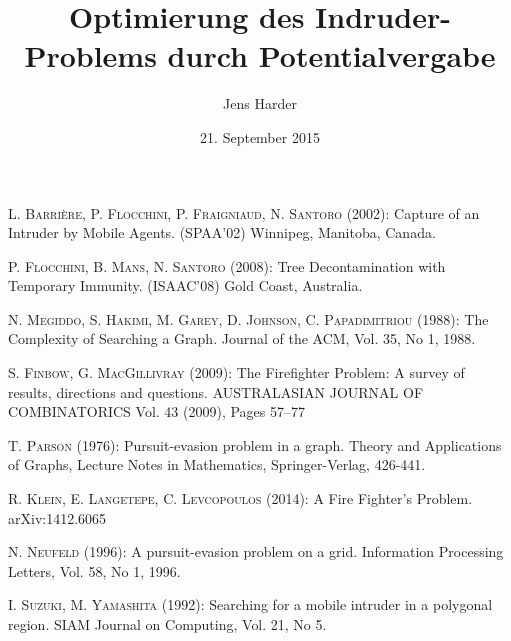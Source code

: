 \documentclass[12pt, a4paper, german]{article}
\author{Jens Harder}
\date{21. September 2015}
\title{Optimierung des Indruder-Problems durch Potentialvergabe}
\begin{document}
	\maketitle
	\newpage
	\pagestyle{empty}
	

	\pagestyle{plain}
	\tableofcontents
	
	\newpage
	
	
	
	
	

	
	
	
	
	
	
	\newpage

	\renewcommand{\refname}{Literaturquellen}
	
	\begin{thebibliography}{99}
		
		
		 \textsc{L. Barrière, P. Flocchini, P. Fraigniaud, N. Santoro} (2002): Capture of an Intruder by Mobile Agents. (SPAA'02) Winnipeg, Manitoba, Canada.

		 \textsc{P. Flocchini, B. Mans, N. Santoro} (2008): Tree Decontamination with Temporary Immunity. (ISAAC'08) Gold Coast, Australia.
		
		 \textsc{N. Megiddo, S. Hakimi, M. Garey, D. Johnson, C. Papadimitriou} (1988): The Complexity of Searching a Graph. Journal of the ACM, Vol. 35, No 1, 1988.
		
		 \textsc{S. Finbow, G. MacGillivray} (2009): The Firefighter Problem: A survey of results, directions and questions.
		AUSTRALASIAN JOURNAL OF COMBINATORICS Vol. 43 (2009), Pages 57–77
		
		 \textsc{T. Parson} (1976): Pursuit-evasion problem in a graph. Theory and Applications of Graphs, Lecture Notes in Mathematics, Springer-Verlag, 426-441.
		
		 \textsc{R. Klein, E. Langetepe, C.  Levcopoulos} (2014): A Fire Fighter's Problem. arXiv:1412.6065
		
		 \textsc{N. Neufeld} (1996): A pursuit-evasion problem on a grid. Information Processing Letters, Vol. 58, No 1, 1996.
		
		 \textsc{I. Suzuki, M. Yamashita} (1992): Searching for a mobile intruder in a polygonal region. SIAM Journal on Computing, Vol. 21, No 5.


		
	\end{thebibliography} 
	
	
\end{document}
